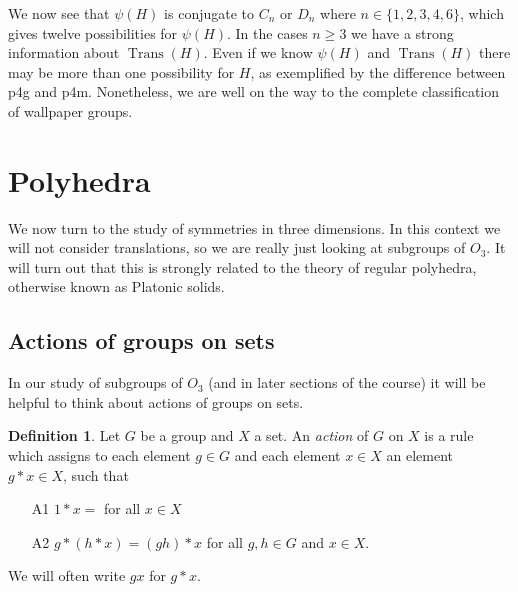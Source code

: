 \documentclass{amsart}
\DeclareMathOperator{\Trans}    {Trans}
\renewcommand{\:}{\colon}
\theoremstyle{definition}
\newtheorem{definition}[theorem]{Definition}
\begin{document}
We now see that $\psi(H)$ is conjugate to $C_n$ or $D_n$ where
$n\in\{1,2,3,4,6\}$, which gives twelve possibilities for $\psi(H)$.
In the cases $n\geq 3$ we have a strong information about $\Trans(H)$.
Even if we know $\psi(H)$ and $\Trans(H)$ there may be more than one
possibility for $H$, as exemplified by the difference between p4g and
p4m.  Nonetheless, we are well on the way to the complete
classification of wallpaper groups.


\section{Polyhedra}

We now turn to the study of symmetries in three dimensions.  In this
context we will not consider translations, so we are really just
looking at subgroups of $O_3$.  It will turn out that this is strongly
related to the theory of regular polyhedra, otherwise known as
Platonic solids.

\subsection{Actions of groups on sets}

In our study of subgroups of $O_3$ (and in later sections of the
course) it will be helpful to think about actions of groups on sets.
\begin{definition}
 Let $G$ be a group and $X$ a set.  An \emph{action} of $G$ on $X$ is
 a rule which assigns to each element $g\in G$ and each element
 $x\in X$ an element $g*x\in X$, such that
 \begin{itemize}
 \item[A1] $1*x=$ for all $x\in X$
 \item[A2] $g*(h*x)=(gh)*x$ for all $g,h\in G$ and $x\in X$.
 \end{itemize}
 We will often write $gx$ for $g*x$.
\end{definition}
\end{document}
